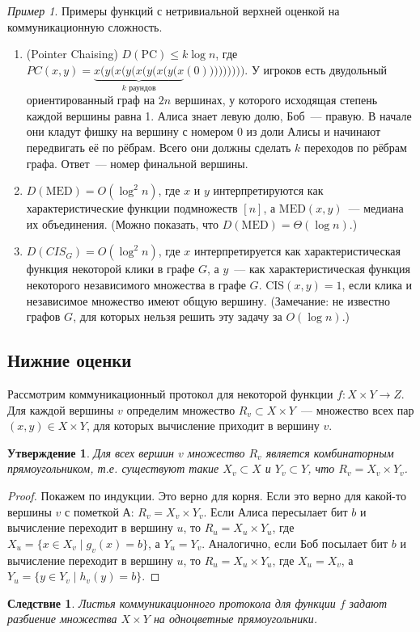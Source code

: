 \documentclass[12pt]{article}
\theoremstyle{definition}
\theoremstyle{plain}
\newtheorem{statement}{Утверждение}[section]
\newtheorem{corollary}{Следствие}[section]
\theoremstyle{remark}
\newtheorem{example}{Пример}[section]
\begin{document}
\begin{example} Примеры функций с нетривиальной верхней оценкой на коммуникационную сложность.
    \begin{enumerate}
        \item (Pointer Chaising) $D(\mathrm{PC})\le k\log n$, 
            где $PC(x,y) = \underbrace{x(y(x(y(x(y(x(y(x}_{\text{$k$ раундов}}(0)))))))))$.
            У игроков есть двудольный ориентированный граф на $2n$ вершинах, у которого исходящая
            степень каждой вершины равна 1. Алиса знает левую долю, Боб~--- правую.
            В начале они кладут фишку на вершину с номером 0 из доли Алисы и начинают
            передвигать её по рёбрам. Всего они должны сделать  $k$ переходов по рёбрам графа.
            Ответ~--- номер финальной вершины.


        \item $D(\mathrm{MED}) = O(\log^2 n)$, где $x$ и $y$ интерпретируются как характеристические
            функции подмножеств $[n]$, а $\mathrm{MED}(x,y)$~--- медиана их объединения.
            (Можно показать, что $D(\mathrm{MED}) = \Theta(\log n)$.)

        \item $D(CIS_G) = O(\log^2 n)$, где $x$ интерпретируется как характеристическая
            функция некоторой клики в графе $G$, а $y$~--- как характеристическая 
            функция некоторого независимого множества в графе $G$. $\mathrm{CIS}(x,y) = 1$, 
            если клика и независимое множество имеют общую вершину.
            (Замечание: не известно графов $G$, для которых нельзя решить 
            эту задачу за $O(\log n)$.)
    \end{enumerate}
\end{example}

\subsection{Нижние оценки}
    Рассмотрим коммуникационный протокол для некоторой функции $f: X\times Y\to Z$. 
    Для каждой вершины $v$ определим множество $R_v\subset X\times Y$~--- множество
    всех пар $(x,y)\in X\times Y$, для которых вычисление приходит в вершину $v$.
\begin{statement}
    Для всех вершин $v$ множество $R_v$ является комбинаторным прямоугольником,
    т.е. существуют такие $X_v\subset X$ и $Y_v\subset Y$, что $R_v = X_v\times Y_v$.
\end{statement}
\begin{proof}
    Покажем по индукции. Это верно для корня. Если это верно для какой-то вершины $v$
    с пометкой А: $R_v = X_v\times Y_v$. Если Алиса пересылает бит $b$ и вычисление
    переходит в вершину $u$, то $R_u = X_u\times Y_u$, 
    где $X_u = \{x\in X_v\mid g_v(x) = b\}$, а $Y_u = Y_v$. Аналогично, если Боб 
    посылает бит $b$ и вычисление переходит в вершину $u$, то $R_u = X_u\times Y_u$, 
    где $X_u = X_v$, а $Y_u = \{y\in Y_v\mid h_v(y) = b\}$.
\end{proof}
\begin{corollary}
    Листья коммуникационного протокола для функции $f$ задают разбиение множества $X\times Y$ на 
    одноцветные прямоугольники.
\end{corollary}
\end{document}
